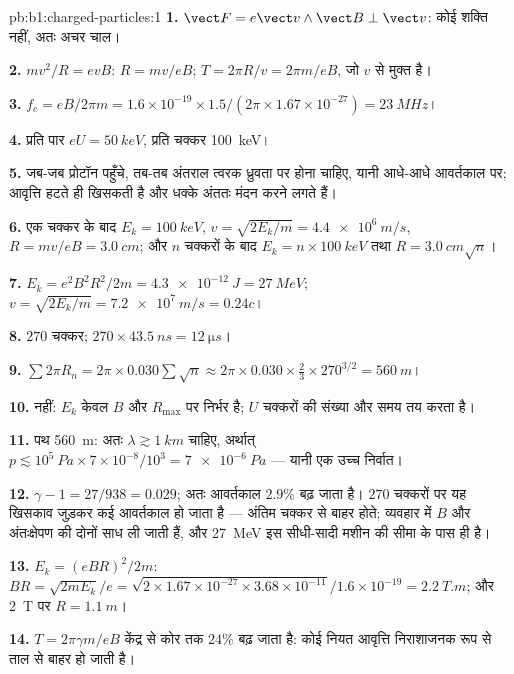 \begin{solution}{pb:b1:charged-particles:1}
\textbf{1.} $\vect F = e\vect v\wedge\vect B \perp \vect v$: कोई शक्ति नहीं,
अतः अचर चाल।

\textbf{2.} $mv^2/R = evB$: $R = mv/eB$; $T = 2\pi R/v = 2\pi m/eB$, जो
$v$ से मुक्त है।

\textbf{3.} $f_c = eB/2\pi m = 1.6\times10^{-19} \times 1.5/(2\pi \times 1.67
\times10^{-27}) = \qty{23}{MHz}$।

\textbf{4.} प्रति पार $eU = \qty{50}{keV}$, प्रति चक्कर \qty{100}{keV}।

\textbf{5.} जब-जब प्रोटॉन पहुँचे, तब-तब अंतराल त्वरक ध्रुवता पर होना
चाहिए, यानी आधे-आधे आवर्तकाल पर; आवृत्ति हटते ही  खिसकती है और धक्के
अंततः मंदन करने लगते हैं।

\textbf{6.} एक चक्कर के बाद $E_k = \qty{100}{keV}$, $v = \sqrt{2E_k/m} =
\qty{4.4e6}{m/s}$, $R = mv/eB = \qty{3.0}{cm}$; और $n$ चक्करों के बाद $E_k =
n \times \qty{100}{keV}$ तथा $R = \qty{3.0}{cm}\sqrt n$।

\textbf{7.} $E_k = e^2B^2R^2/2m = \qty{4.3e-12}{J} = \qty{27}{MeV}$; $v =
\sqrt{2E_k/m} = \qty{7.2e7}{m/s} = 0.24c$।

\textbf{8.} $270$ चक्कर; $270 \times \qty{43.5}{ns} = \qty{12}{\micro s}$।

\textbf{9.} $\sum 2\pi R_n = 2\pi \times 0.030\sum\sqrt n \approx 2\pi \times 0.030
\times \tfrac23 \times 270^{3/2} = \qty{560}{m}$।

\textbf{10.} नहीं: $E_k$ केवल $B$ और $R_{\max}$ पर निर्भर है; $U$ चक्करों
की संख्या और समय तय करता है।

\textbf{11.} पथ \qty{560}{m}: अतः $\lambda \gtrsim \qty{1}{km}$ चाहिए,
अर्थात् $p \lesssim 10^5\ \unit{Pa} \times 7\times10^{-8}/10^3 = \qty{7e-6}{Pa}$
--- यानी एक उच्च निर्वात।

\textbf{12.} $\gamma - 1 = 27/938 = 0.029$; अतः आवर्तकाल $2.9\%$ बढ़ जाता
है। $270$ चक्करों पर यह खिसकाव जुड़कर कई आवर्तकाल हो जाता है --- अंतिम
चक्कर  से बाहर होते; व्यवहार में $B$ और अंतःक्षेपण की  दोनों साध ली
जाती हैं, और \qty{27}{MeV} इस सीधी-सादी मशीन की सीमा के पास ही है।

\textbf{13.} $E_k = (eBR)^2/2m$: $BR = \sqrt{2mE_k}/e = \sqrt{2 \times 1.67\times
10^{-27} \times 3.68\times10^{-11}}/1.6\times10^{-19} = \qty{2.2}{T.m}$; और \qty{2}{T} पर $R =
\qty{1.1}{m}$।

\textbf{14.} $T = 2\pi\gamma m/eB$ केंद्र से कोर तक $24\%$ बढ़ जाता है: कोई
नियत आवृत्ति निराशाजनक रूप से ताल से बाहर हो जाती है।


\end{solution}
